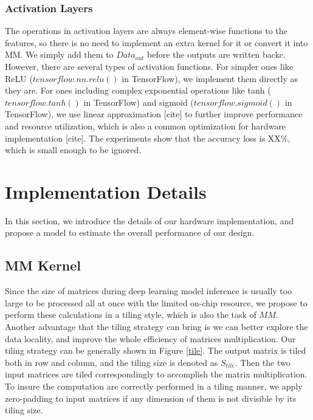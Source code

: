 \documentclass{acm_proc_article-sp-copy}
\begin{document}
\subsubsection{Activation Layers}
The operations in activation layers are always element-wise functions to the features, so there is no need to implement an extra kernel for it or convert it into MM. We simply add them to $Data_{out}$ before the outputs are written backc. However, there are several types of activation functions. For simpler ones like ReLU ($tensorflow.nn.relu()$ in TensorFlow), we implement them directly as they are. For ones including complex exponential operations like tanh ($tensorflow.tanh()$ in TensorFlow) and sigmoid ($tensorflow.sigmoid()$ in TensorFlow), we use linear approximation [cite] to further improve performance and resource utilization, which is also a common optimization for hardware implementation [cite]. The experiments show that the accuracy loss is XX\%, which is small enough to be ignored.

\section{Implementation  Details}
In this section, we introduce the details of our hardware implementation, and propose a model to estimate the overall performance of our design.

\subsection{MM Kernel}
Since the size of matrices during deep learning model inference is usually too large to be processed all at once with the limited on-chip resource, we propose to perform these calculations in a tiling style, which is also the task of $MM$. Another advantage that the tiling strategy can bring is we can better explore the data locality, and improve the whole efficiency of matrices multiplication. Our tiling strategy can be generally shown in Figure \ref{tile}. The output matrix is tiled both in row and column, and the tiling size is denoted as $S_{tile}$. Then the two input matrices are tiled correspondingly to accomplish the matrix multiplication. To insure the computation are correctly performed in a tiling manner, we apply zero-padding to input matrices if any dimension of them is not divisible by its tiling size.
\end{document}
